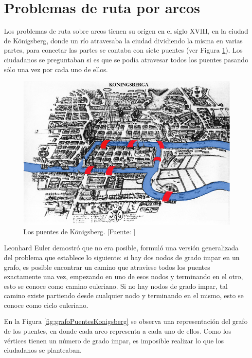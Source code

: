 \section{Problemas de ruta por arcos}

Los problemas de ruta sobre arcos tienen su origen en el siglo XVIII, en la ciudad de Königsberg, donde un río atravesaba la ciudad dividiendo la misma en varias partes, para conectar las partes se contaba con siete puentes (ver Figura \ref{fig:puentesKonigsberg}). Los ciudadanos se preguntaban si es que se podía atravesar todos los puentes pasando sólo una vez por cada uno de ellos.

\begin{figure}[H]
\centerline{\includegraphics[width=\textwidth]{Konigsberg_bridges.png}}
\caption{Los puentes de Königsberg. [Fuente: \citep{KonigsbergBridges}]}
\label{fig:puentesKonigsberg}
\end{figure}

Leonhard Euler demostró que no era posible, formuló una versión generalizada del problema que establece lo siguiente: si hay dos nodos de grado impar en un grafo, es posible encontrar un camino que atraviese todos los puentes exactamente una vez, empezando en uno de esos nodos y terminando en el otro, esto se conoce como camino euleriano. Si no hay nodos de grado impar, tal camino existe partiendo desde cualquier nodo y terminando en el mismo, esto se conoce como ciclo euleriano. 

En la Figura \ref{fig:grafoPuentesKonigsberg} se observa una representación del grafo de los puentes, en donde cada arco representa a cada uno de ellos. Como los vértices tienen un número de grado impar, es imposible realizar lo que los ciudadanos se planteaban.

